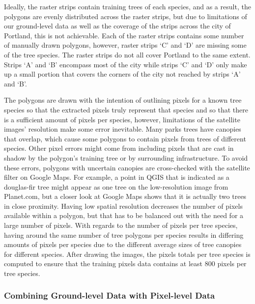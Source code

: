 \documentclass[12pt,twoside]{reedthesis}
\begin{document}
Ideally, the raster strips contain training trees of each species, and as a result, the polygons are evenly distributed across the raster strips, but due to limitations of our ground-level data as well as the coverage of the strips across the city of Portland, this is not achievable. Each of the raster strips contains some number of manually drawn polygons, however, raster strips `C' and `D' are missing some of the tree species. The raster strips do not all cover Portland to the same extent. Strips `A' and `B' encompass most of the city while strips `C' and `D' only make up a small portion that covers the corners of the city not reached by strips `A' and `B'.

The polygons are drawn with the intention of outlining pixels for a known tree species so that the extracted pixels truly represent that species and so that there is a sufficient amount of pixels per species, however, limitations of the satellite images' resolution make some error inevitable. Many parks trees have canopies that overlap, which cause some polygons to contain pixels from trees of different species. Other pixel errors might come from including pixels that are cast in shadow by the polygon's training tree or by surrounding infrastructure. To avoid these errors, polygons with uncertain canopies are cross-checked with the satellite filter on Google Maps. For example, a point in QGIS that is indicated as a douglas-fir tree might appear as one tree on the low-resolution image from Planet.com, but a closer look at Google Maps shows that it is actually two trees in close proximity. Having low spatial resolution decreases the number of pixels available within a polygon, but that has to be balanced out with the need for a large number of pixels. With regards to the number of pixels per tree species, having around the same number of tree polygons per species results in differing amounts of pixels per species due to the different average sizes of tree canopies for different species. After drawing the images, the pixels totals per tree species is computed to ensure that the training pixels data contains at least 800 pixels per tree species.

\hypertarget{combining-ground-level-data-with-pixel-level-data}{%
\subsubsection{Combining Ground-level Data with Pixel-level Data}\label{combining-ground-level-data-with-pixel-level-data}}
\end{document}
